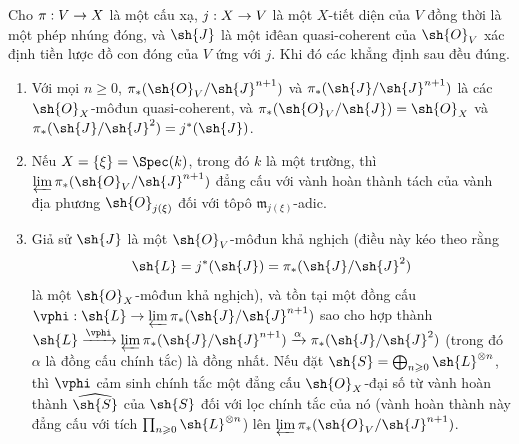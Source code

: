 \documentclass[oneside,10pt]{amsart}
\makeatletter
\renewcommand{\geq}{\geqslant}
\newcommand{\ega@arrow}[2]{\mathchoice{#1}{#2}{#2}{#2}}
\renewcommand{\to}{\ega@arrow{\longrightarrow}{\rightarrow}}
\let\EGAOriginalLabel\label
\renewcommand{\label}[1]{\phantomsection\EGAOriginalLabel{#1}}
\makeatother
\begin{document}
\begin{lemma}[8.10.1]
\label{II.8.10.1}
Cho $\pi:V\to X$ là một cấu xạ, $j:X\to V$ là một $X$-tiết diện của $V$ đồng thời là một phép nhúng đóng, và $\sh{J}$ là một iđêan quasi-coherent của $\sh{O}_V$ xác định tiền lược đồ con đóng của $V$ ứng với $j$.
Khi đó các khẳng định sau đều đúng.
\begin{enumerate}
  \item[\rm{(i)}] Với mọi $n\geq0$, $\pi_*(\sh{O}_V/\sh{J}^{n+1})$ và $\pi_*(\sh{J}/\sh{J}^{n+1})$ là các $\sh{O}_X$-môđun quasi-coherent, và $\pi_*(\sh{O}_V/\sh{J})=\sh{O}_X$ và $\pi_*(\sh{J}/\sh{J}^2)=j^*(\sh{J})$.
  \item[\rm{(ii)}] Nếu $X=\{\xi\}=\Spec(k)$, trong đó $k$ là một trường, thì $\varprojlim\pi_*(\sh{O}_V/\sh{J}^{n+1})$ đẳng cấu với vành hoàn thành tách của vành địa phương $\sh{O}_{j(\xi)}$ đối với tôpô $\mathfrak{m}_{j(\xi)}$-adic.
  \item[\rm{(iii)}] Giả sử $\sh{J}$ là một $\sh{O}_V$-môđun khả nghịch (điều này kéo theo rằng
    \[
      \sh{L} = j^*(\sh{J}) = \pi_*(\sh{J}/\sh{J}^2)
    \]
    là một $\sh{O}_X$-môđun khả nghịch), và tồn tại một đồng cấu $\vphi:\sh{L}\to\varprojlim\pi_*(\sh{J}/\sh{J}^{n+1})$ sao cho hợp thành $\sh{L} \xrightarrow{\vphi} \varprojlim\pi_*(\sh{J}/\sh{J}^{n+1}) \xrightarrow{\alpha} \pi_*(\sh{J}/\sh{J}^2)$ (trong đó $\alpha$ là đồng cấu chính tắc) là đồng nhất.
    Nếu đặt $\sh{S}=\bigoplus_{n\geq0}\sh{L}^{\otimes n}$, thì $\vphi$ cảm sinh chính tắc một đẳng cấu $\sh{O}_X$-đại số từ vành hoàn thành $\widehat{\sh{S}}$ của $\sh{S}$ đối với lọc chính tắc của nó (vành hoàn thành này đẳng cấu với tích $\prod_{n\geq0}\sh{L}^{\otimes n}$) lên $\varprojlim\pi_*(\sh{O}_V/\sh{J}^{n+1})$.
\end{enumerate}
\end{lemma}
\end{document}
